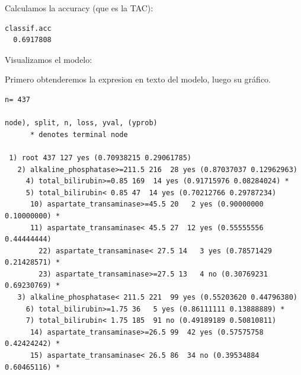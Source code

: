 \documentclass[
  11pt,
  a4paper,
]{article}
\newenvironment{Shaded}{\begin{snugshade}}{\end{snugshade}}
\newcommand{\DecValTok}[1]{\textcolor[rgb]{0.00,0.00,0.81}{#1}}
\newcommand{\FunctionTok}[1]{\textcolor[rgb]{0.00,0.00,0.00}{#1}}
\newcommand{\NormalTok}[1]{#1}
\newcommand{\OtherTok}[1]{\textcolor[rgb]{0.56,0.35,0.01}{#1}}
\newcommand{\SpecialCharTok}[1]{\textcolor[rgb]{0.00,0.00,0.00}{#1}}
\newcommand{\StringTok}[1]{\textcolor[rgb]{0.31,0.60,0.02}{#1}}
\begin{document}
Calculamos la accuracy (que es la TAC):

\begin{Shaded}
\end{Shaded}

\begin{verbatim}
classif.acc 
  0.6917808 
\end{verbatim}

\vspace{0.25cm}

Visualizamos el modelo:

Primero obtenderemos la expresion en texto del modelo, luego su gráfico.

\begin{Shaded}
\end{Shaded}

\begin{verbatim}
n= 437 

node), split, n, loss, yval, (yprob)
      * denotes terminal node

 1) root 437 127 yes (0.70938215 0.29061785)  
   2) alkaline_phosphatase>=211.5 216  28 yes (0.87037037 0.12962963)  
     4) total_bilirubin>=0.85 169  14 yes (0.91715976 0.08284024) *
     5) total_bilirubin< 0.85 47  14 yes (0.70212766 0.29787234)  
      10) aspartate_transaminase>=45.5 20   2 yes (0.90000000 0.10000000) *
      11) aspartate_transaminase< 45.5 27  12 yes (0.55555556 0.44444444)  
        22) aspartate_transaminase< 27.5 14   3 yes (0.78571429 0.21428571) *
        23) aspartate_transaminase>=27.5 13   4 no (0.30769231 0.69230769) *
   3) alkaline_phosphatase< 211.5 221  99 yes (0.55203620 0.44796380)  
     6) total_bilirubin>=1.75 36   5 yes (0.86111111 0.13888889) *
     7) total_bilirubin< 1.75 185  91 no (0.49189189 0.50810811)  
      14) aspartate_transaminase>=26.5 99  42 yes (0.57575758 0.42424242) *
      15) aspartate_transaminase< 26.5 86  34 no (0.39534884 0.60465116) *
\end{verbatim}
\end{document}

